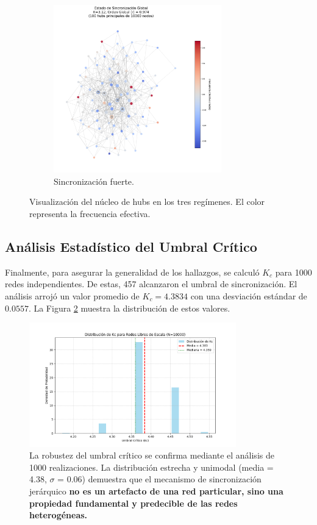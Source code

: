 \documentclass[12pt, a4paper]{article}
\begin{document}
\begin{figure}[htbp]
\begin{subfigure}[b]{\textwidth}
        \centering
        \includegraphics[width=0.8\textwidth]{img/3_3.png}
        \caption{Sincronización fuerte.}
    \end{subfigure}
    \caption{Visualización del núcleo de hubs en los tres regímenes. El color representa la frecuencia efectiva.}
    \label{fig:hubs}
\end{figure}


\subsection{Análisis Estadístico del Umbral Crítico}
Finalmente, para asegurar la generalidad de los hallazgos, se calculó \(K_c\) para 1000 redes independientes. De estas, 457 alcanzaron el umbral de sincronización. El análisis arrojó un valor promedio de \(K_c = 4.3834\) con una desviación estándar de \(0.0557\). La Figura \ref{fig:kc_hist} muestra la distribución de estos valores.

\begin{figure}[htbp]
    \centering
    \includegraphics[width=0.8\textwidth]{img/4_1.png}
    \caption{La robustez del umbral crítico se confirma mediante el análisis de 1000 realizaciones. La distribución estrecha y unimodal (media = 4.38, \(\sigma\) = 0.06) demuestra que el mecanismo de sincronización jerárquico \textbf{no es un artefacto de una red particular, sino una propiedad fundamental y predecible de las redes heterogéneas.}}
    \label{fig:kc_hist}
\end{figure}
\end{document}
